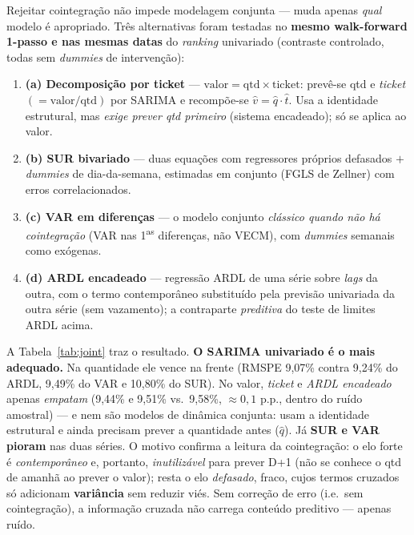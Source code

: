 \documentclass[11pt,a4paper]{article}
\begin{document}
Rejeitar cointegração não impede modelagem conjunta --- muda apenas \emph{qual} modelo é apropriado.
Três alternativas foram testadas no \textbf{mesmo walk-forward 1-passo e nas mesmas datas} do
\emph{ranking} univariado (contraste controlado, todas sem \emph{dummies} de intervenção):
\begin{enumerate}\setlength\itemsep{1pt}
\item \textbf{(a) Decomposição por ticket} --- $\text{valor}=\text{qtd}\times\text{ticket}$:
prevê-se qtd e \emph{ticket} $(=\text{valor}/\text{qtd})$ por SARIMA e recompõe-se $\hat v=\hat
q\cdot\hat t$. Usa a identidade estrutural, mas \emph{exige prever qtd primeiro} (sistema
encadeado); só se aplica ao valor.
\item \textbf{(b) SUR bivariado} --- duas equações com regressores próprios defasados $+$
\emph{dummies} de dia-da-semana, estimadas em conjunto (FGLS de Zellner) com erros correlacionados.
\item \textbf{(c) VAR em diferenças} --- o modelo conjunto \emph{clássico quando não há
cointegração} (VAR nas 1\textsuperscript{as} diferenças, não VECM), com \emph{dummies} semanais como
exógenas.
\item \textbf{(d) ARDL encadeado} --- regressão ARDL de uma série sobre \emph{lags} da outra, com o
termo contemporâneo substituído pela previsão univariada da outra série (sem vazamento); a
contraparte \emph{preditiva} do teste de limites ARDL acima.
\end{enumerate}

A Tabela~\ref{tab:joint} traz o resultado. \textbf{O SARIMA univariado é o mais adequado.} Na
quantidade ele vence na frente (RMSPE 9,07\% contra 9,24\% do ARDL, 9,49\% do VAR e 10,80\% do SUR).
No valor, \emph{ticket} e \emph{ARDL encadeado} apenas \emph{empatam} (9,44\% e 9,51\% vs.\ 9,58\%,
$\approx 0{,}1$ p.p., dentro do ruído amostral) --- e nem são modelos de dinâmica conjunta: usam a
identidade estrutural e ainda precisam prever a quantidade antes ($\hat q$). Já \textbf{SUR e VAR
pioram} nas duas séries. O motivo confirma a
leitura da cointegração: o elo forte é \emph{contemporâneo} e, portanto, \emph{inutilizável} para
prever D+1 (não se conhece o qtd de amanhã ao prever o valor); resta o elo \emph{defasado}, fraco,
cujos termos cruzados só adicionam \textbf{variância} sem reduzir viés. Sem correção de erro
(i.e.\ sem cointegração), a informação cruzada não carrega conteúdo preditivo --- apenas ruído.
\end{document}
